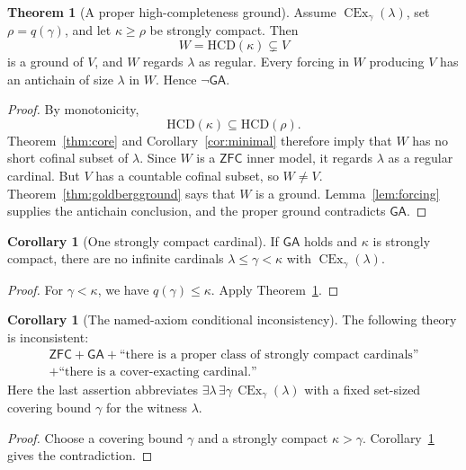 \documentclass[11pt,letterpaper]{article}
\theoremstyle{definition}
\newtheorem{theorem}[definition]{Theorem}
\newtheorem{corollary}[definition]{Corollary}
\newcommand{\ZFC}{\mathsf{ZFC}}
\newcommand{\CEx}{\operatorname{CEx}}
\newcommand{\HCD}{\mathrm{HCD}}
\newcommand{\GA}{\mathsf{GA}}
\begin{document}
\begin{theorem}[A proper high-completeness ground]\label{thm:ground}
Assume $\CEx_\gamma(\lambda)$, set $\rho=q(\gamma)$, and let $\kappa\geq\rho$ be strongly compact. Then
\[
 W=\HCD(\kappa)\subsetneq V
\]
is a ground of $V$, and $W$ regards $\lambda$ as regular. Every forcing in $W$ producing $V$ has an antichain of size $\lambda$ in $W$. Hence $\neg\GA$.
\end{theorem}

\begin{proof}
By monotonicity,
\[
 \HCD(\kappa)\subseteq\HCD(\rho).
\]
Theorem~\ref{thm:core} and Corollary~\ref{cor:minimal} therefore imply that $W$ has no short cofinal subset of $\lambda$. Since $W$ is a $\ZFC$ inner model, it regards $\lambda$ as a regular cardinal. But $V$ has a countable cofinal subset, so $W\neq V$. Theorem~\ref{thm:goldbergground} says that $W$ is a ground. Lemma~\ref{lem:forcing} supplies the antichain conclusion, and the proper ground contradicts $\GA$.
\end{proof}

\begin{corollary}[One strongly compact cardinal]\label{cor:oneGA}
If $\GA$ holds and $\kappa$ is strongly compact, there are no infinite cardinals $\lambda\leq\gamma<\kappa$ with $\CEx_\gamma(\lambda)$.
\end{corollary}

\begin{proof}
For $\gamma<\kappa$, we have $q(\gamma)\leq\kappa$. Apply Theorem~\ref{thm:ground}.
\end{proof}

\begin{corollary}[The named-axiom conditional inconsistency]\label{cor:PCGA}
The following theory is inconsistent:
\[
\begin{gathered}
 \ZFC+\GA
 +\text{``there is a proper class of strongly compact cardinals''}\\
 +\text{``there is a cover-exacting cardinal.''}
\end{gathered}
\]
Here the last assertion abbreviates $\exists\lambda\,\exists\gamma\,\CEx_\gamma(\lambda)$ with a fixed set-sized covering bound $\gamma$ for the witness $\lambda$.
\end{corollary}

\begin{proof}
Choose a covering bound $\gamma$ and a strongly compact $\kappa>\gamma$. Corollary~\ref{cor:oneGA} gives the contradiction.
\end{proof}
\end{document}
